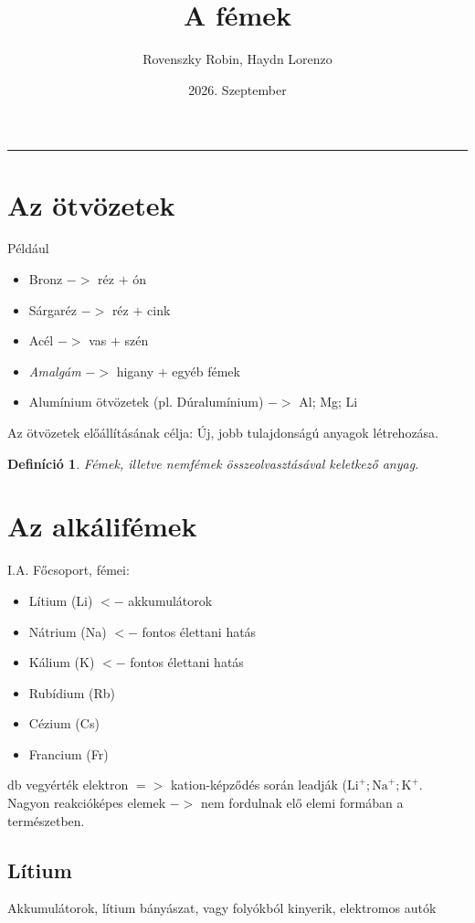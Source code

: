 \documentclass{article}
\title{A fémek}
\author{Rovenszky Robin, Haydn Lorenzo}
\date{2026. Szeptember}
\newtheorem{definition}{Definíció}
\begin{document}
\maketitle
\tableofcontents

\vspace{14pt}
\hrule

\section{Az ötvözetek}

Például
\begin{itemize}
    \item Bronz $->$ réz $+$ ón
    \item Sárgaréz $->$ réz $+$ cink
    \item Acél $->$ vas $+$ szén
    \item \emph{Amalgám} $->$ higany $+$ egyéb fémek
    \item Alumínium ötvözetek (pl. Dúralumínium) $->$ Al; Mg; Li 
\end{itemize}

\noindent
Az ötvözetek előállításának célja: Új, jobb tulajdonságú anyagok létrehozása.

\begin{definition}
    Fémek, illetve nemfémek összeolvasztásával keletkező anyag.
\end{definition}

\section{Az alkálifémek}
I.A. Főcsoport, fémei:
\begin{itemize}
    \item Lítium (Li) $<-$ akkumulátorok
    \item Nátrium (Na) $<-$ fontos élettani hatás
    \item Kálium (K) $<-$ fontos élettani hatás
    \item Rubídium (Rb)
    \item Cézium (Cs)
    \item Francium (Fr)
\end{itemize}

 db vegyérték elektron $=>$ kation-képződés során leadják ($\text{Li}^+; \text{Na}^+; \text{K}^+$.
Nagyon reakcióképes elemek $->$ nem fordulnak elő elemi formában a természetben.

\subsection{Lítium}
Akkumulátorok, lítium bányászat, vagy folyókból kinyerik, elektromos autók
\end{document}
